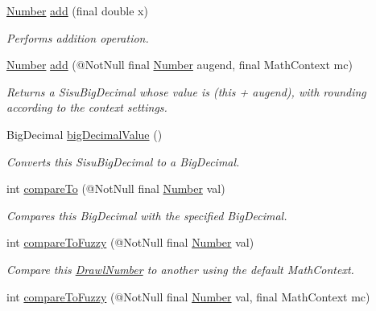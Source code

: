 \begin{DoxyCompactItemize}
\hyperlink{interfacecom_1_1aarrelaakso_1_1drawl_1_1_number}{Number} \hyperlink{interfacecom_1_1aarrelaakso_1_1drawl_1_1_number_abd063ef436254888b283a30da6fff78a}{add} (final double x)
\begin{DoxyCompactList}\small\item\em Performs addition operation. \end{DoxyCompactList}\item 
\hyperlink{interfacecom_1_1aarrelaakso_1_1drawl_1_1_number}{Number} \hyperlink{interfacecom_1_1aarrelaakso_1_1drawl_1_1_number_ad71ea7d41bcc751bc6e08ccd0d5f9885}{add} (@Not\+Null final \hyperlink{interfacecom_1_1aarrelaakso_1_1drawl_1_1_number}{Number} augend, final Math\+Context mc)
\begin{DoxyCompactList}\small\item\em Returns a Sisu\+Big\+Decimal whose value is (this + augend), with rounding according to the context settings. \end{DoxyCompactList}\item 
Big\+Decimal \hyperlink{interfacecom_1_1aarrelaakso_1_1drawl_1_1_number_a88d32e8ed7137662dc845ac6937107e6}{big\+Decimal\+Value} ()
\begin{DoxyCompactList}\small\item\em Converts this Sisu\+Big\+Decimal to a Big\+Decimal. \end{DoxyCompactList}\item 
int \hyperlink{interfacecom_1_1aarrelaakso_1_1drawl_1_1_number_a8182808f41dc9573e32884e7155f2776}{compare\+To} (@Not\+Null final \hyperlink{interfacecom_1_1aarrelaakso_1_1drawl_1_1_number}{Number} val)
\begin{DoxyCompactList}\small\item\em Compares this Big\+Decimal with the specified Big\+Decimal. \end{DoxyCompactList}\item 
int \hyperlink{interfacecom_1_1aarrelaakso_1_1drawl_1_1_number_abe6993852fed7bc6f13dbda74b78dde3}{compare\+To\+Fuzzy} (@Not\+Null final \hyperlink{interfacecom_1_1aarrelaakso_1_1drawl_1_1_number}{Number} val)
\begin{DoxyCompactList}\small\item\em Compare this \hyperlink{classcom_1_1aarrelaakso_1_1drawl_1_1_drawl_number}{Drawl\+Number} to another using the default Math\+Context. \end{DoxyCompactList}\item 
int \hyperlink{interfacecom_1_1aarrelaakso_1_1drawl_1_1_number_afb73cae0a12c1d25e450be6270eecfb1}{compare\+To\+Fuzzy} (@Not\+Null final \hyperlink{interfacecom_1_1aarrelaakso_1_1drawl_1_1_number}{Number} val, final Math\+Context mc)

\end{DoxyCompactItemize}
